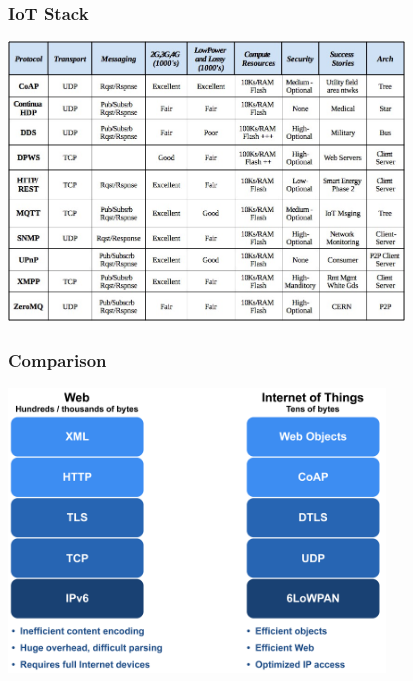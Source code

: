 \documentclass{beamer}
\begin{document}
\begin{frame}
	\frametitle{IoT Stack}
	\vspace{.25cm}
	\hspace*{.75cm} \includegraphics[width=10.5cm]{figs/iot-network-protocols.jpeg}
\end{frame}

\begin{frame}
	\frametitle{Comparison}
	\vspace{.5cm}
	\hspace*{1.5cm} \includegraphics[width=10cm]{figs/Web-and-IoT-Stacks-1.png}
\end{frame}
\end{document}

